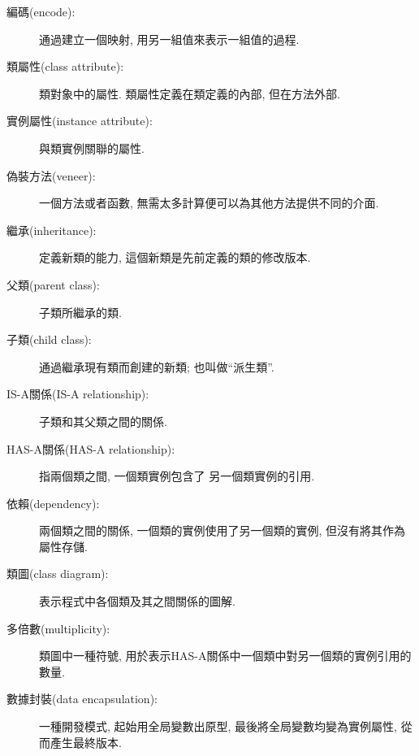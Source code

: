 \documentclass[10pt]{book}
\begin{document}
\begin{description}

\item[編碼(encode):] 通過建立一個映射, 用另一組值來表示一組值的過程.

\item[類屬性(class attribute):] 類對象中的屬性. 類屬性定義在類定義的內部, 
但在方法外部. 

\item[實例屬性(instance attribute):] 與類實例關聯的屬性.

\item[偽裝方法(veneer):] 一個方法或者函數, 無需太多計算便可以為其他方法提供不同的介面. 

\item[繼承(inheritance):] 定義新類的能力, 這個新類是先前定義的類的修改版本. 

\item[父類(parent class):] 子類所繼承的類.

\item[子類(child class):] 通過繼承現有類而創建的新類; 也叫做``派生類''. 

\item[IS-A關係(IS-A relationship):] 子類和其父類之間的關係.

\item[HAS-A關係(HAS-A relationship):] 指兩個類之間, 一個類實例包含了
另一個類實例的引用.

\item[依賴(dependency):] 兩個類之間的關係, 
一個類的實例使用了另一個類的實例, 但沒有將其作為屬性存儲. 

\item[類圖(class diagram):] 表示程式中各個類及其之間關係的圖解. 

\item[多倍數(multiplicity):] 類圖中一種符號, 
用於表示HAS-A關係中一個類中對另一個類的實例引用的數量. 

\item[數據封裝(data encapsulation):] 一種開發模式, 
起始用全局變數出原型, 最後將全局變數均變為實例屬性, 從而產生最終版本. 

\end{description}
\end{document}
